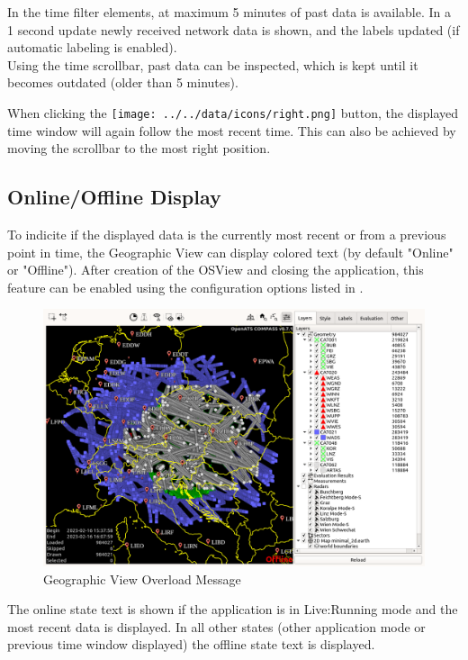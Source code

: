 In the time filter elements, at maximum 5 minutes of past data is available. In a 1 second update newly received network data is shown, and the labels updated (if automatic labeling is enabled). \\

Using the time scrollbar, past data can be inspected, which is kept until it becomes outdated (older than 5 minutes).

When clicking the \texttt{[image: ../../data/icons/right.png]} button, the displayed time window will again follow the most recent time. This can also be achieved by moving the scrollbar to the most right position.

\subsection{Online/Offline Display}

To indicite if the displayed data is the currently most recent or from a previous point in time, the Geographic View can display colored text (by default "Online" or "Offline"). After creation of the OSView and closing the application, this feature can be enabled using the configuration options listed in .

\begin{figure}[H]
    \hspace*{-2.5cm}
    \includegraphics[width=19cm,frame]{figures/geoview_offline_status.png}
  \caption{Geographic View Overload Message}
\end{figure} 

The online state text is shown if the application is in Live:Running mode and the most recent data is displayed. In all other states (other application mode or previous time window displayed) the offline state text is displayed.


